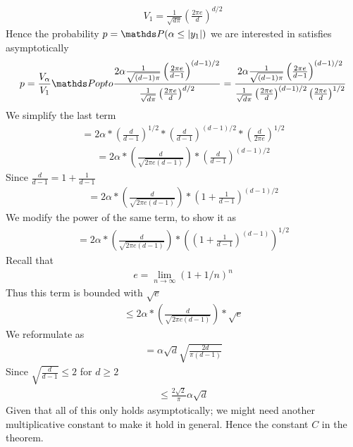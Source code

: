 \documentclass[a4paper, english, headtopline=0.08em, headsepline=0.04em, left = 1cm, right = 1cm, DIV=15]{article}
\begin{document}
\begin{align*}
	V_1 = \frac{1}{\sqrt{d\pi}}\left(\frac{2 \pi e}{d}\right)^{d/2}
\end{align*}
Hence the probability $p=\PP (\alpha \leq|y_1|)$ we are interested in satisfies asymptotically
\begin{align*}
	p=\frac{V_\alpha}{V_1} \PP opto
\frac{2\alpha\frac{1}{\sqrt{(d-1)\pi}}\left(\frac{2 \pi e}{d-1}\right)^{(d-1)/2}}
 {\frac{1}{\sqrt{d\pi}}\left(\frac{2 \pi e}{d}\right)^{d/2}}
=
\frac{2\alpha\frac{1}{\sqrt{(d-1)\pi}}\left(\frac{2 \pi e}{d-1}\right)^{(d-1)/2}}
{\frac{1}{\sqrt{d\pi}}\left(\frac{2 \pi e}{d}\right)^{(d-1)/2}\left(\frac{2 \pi e}{d}\right)^{1/2}}
\end{align*}
We simplify the last term
\begin{align*}
	=2\alpha* \left(\frac{d}{d-1}\right)^{1/2} *   \left(\frac{d}{d-1}\right)^{(d-1)/2} * \left(\frac{d}{2\pi e}\right)^{1/2}
\end{align*}
\begin{align*}
	=2\alpha*  \left(\frac{d}{\sqrt{2\pi e (d-1)}}\right) *   \left(\frac{d}{d-1}\right)^{(d-1)/2}
\end{align*}
 Since $\frac{d}{d-1} = 1+\frac{1}{d-1}$
\begin{align*}
	=2\alpha*  \left(\frac{d}{\sqrt{2\pi e (d-1)}}\right) *   \left(1+\frac{1}{d-1}\right)^{(d-1)/2}
\end{align*}
We modify the power of the same term, to show it as
\begin{align*}
	=2\alpha*  \left(\frac{d}{\sqrt{2\pi e (d-1)}}\right) *   \left(\left(1+\frac{1}{d-1}\right)^{(d-1)}\right)^{1/2}
\end{align*}
Recall that 
\begin{align*}
	e = \lim_{n \rightarrow \infty} \left(1+1/n\right)^n
\end{align*}
Thus this term is bounded with $\sqrt{e}$
\begin{align*}
	\leq 2\alpha*  \left(\frac{d}{\sqrt{2\pi e (d-1)}}\right) *   \sqrt{e}
\end{align*}
We reformulate as
\begin{align*}
	= \alpha \sqrt{d}\sqrt{\frac{2d}{\pi(d-1)}}
\end{align*}
Since $\sqrt{\frac{d}{d-1}}\leq 2$ for $d\geq 2$
\begin{align*}
	\leq \frac{2\sqrt{2}}{\pi}\alpha \sqrt{d} 
\end{align*}
Given that all of this only holds asymptotically; we might need another multiplicative constant to make it hold in general. Hence the constant $C$ in the theorem.
\end{document}
